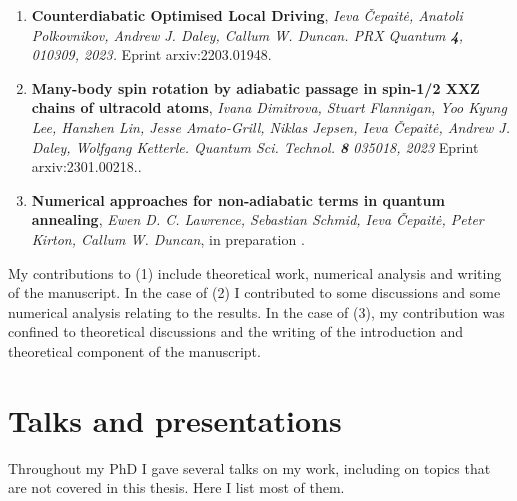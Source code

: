 \begin{enumerate}
    \item \textbf{Counterdiabatic Optimised Local Driving}, \textit{Ieva Čepaitė, Anatoli Polkovnikov, Andrew J. Daley, Callum W. Duncan. PRX Quantum \textbf{4}, 010309, 2023.} Eprint arxiv:2203.01948. \cite{cepaite_counterdiabatic_2023}
    \item \textbf{Many-body spin rotation by adiabatic passage in
    spin-1/2 XXZ chains of ultracold atoms}, \textit{Ivana Dimitrova, Stuart Flannigan, Yoo Kyung Lee, Hanzhen Lin,  Jesse Amato-Grill, Niklas Jepsen, Ieva Čepaitė, Andrew J. Daley, Wolfgang Ketterle. Quantum Sci. Technol. \textbf{8} 035018, 2023} Eprint arxiv:2301.00218.\cite{dimitrova_many-body_2023}.
    \item \textbf{Numerical approaches for non-adiabatic terms in quantum annealing}, \textit{Ewen D. C. Lawrence, Sebastian Schmid, Ieva Čepaitė, Peter Kirton, Callum W. Duncan}, in preparation \cite{lawrence_numerical_2023}.
\end{enumerate}

My contributions to (1) include theoretical work, numerical analysis and writing of the manuscript. In the case of (2) I contributed to some discussions and some numerical analysis relating to the results. In the case of (3), my contribution was confined to theoretical discussions and the writing of the introduction and theoretical component of the manuscript.

\section{Talks and presentations}

Throughout my PhD I gave several talks on my work, including on topics that are not covered in this thesis. Here I list most of them.

